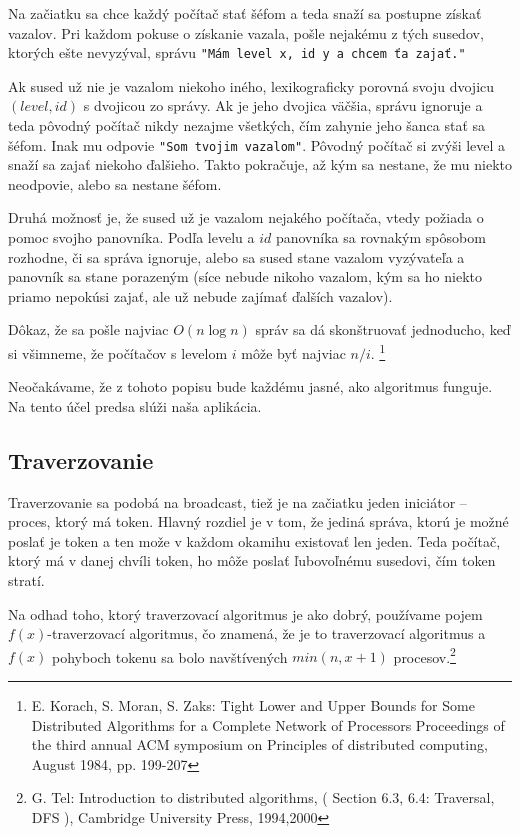 Na začiatku sa chce každý počítač stať šéfom a teda snaží sa postupne získať vazalov. Pri každom
pokuse o získanie vazala, pošle nejakému z tých susedov, ktorých ešte nevyzýval, správu \verb!"Mám level x, id y a chcem ťa zajať."! 

Ak sused už nie je vazalom niekoho iného, lexikograficky porovná svoju dvojicu $(level, id)$ s
dvojicou zo správy. 
Ak je jeho dvojica väčšia, správu ignoruje a teda pôvodný počítač nikdy nezajme všetkých, čím
zahynie jeho šanca stať sa šéfom. 
Inak mu odpovie \verb!"Som tvojim vazalom"!. Pôvodný počítač si zvýši level a snaží sa zajať niekoho
ďalšieho. Takto pokračuje, až kým sa nestane, že mu niekto neodpovie, alebo sa nestane šéfom.

Druhá možnosť je, že sused už je vazalom nejakého počítača, vtedy požiada o pomoc svojho panovníka.
Podľa levelu a $id$ panovníka sa rovnakým spôsobom rozhodne, či sa správa ignoruje, alebo 
sa sused stane vazalom vyzývateľa a panovník sa stane porazeným (síce nebude nikoho vazalom, kým sa
ho niekto priamo nepokúsi zajať, ale už nebude zajímať ďalších vazalov).

Dôkaz, že sa pošle najviac $O(n\log n)$ správ sa dá skonštruovať jednoducho, keď si všimneme, 
že počítačov s levelom $i$ môže byť najviac $n/i$.
\footnote{E. Korach, S. Moran, S. Zaks: Tight Lower and Upper Bounds for Some Distributed Algorithms
for a Complete Network of Processors Proceedings of the third annual ACM symposium on Principles of
distributed computing, August 1984, pp. 199-207}
 
Neočakávame, že z tohoto popisu bude každému jasné, ako algoritmus funguje. Na tento účel predsa
slúži naša aplikácia.

\subsection{Traverzovanie}

Traverzovanie sa podobá na broadcast, tiež je na začiatku jeden iniciátor -- proces, ktorý má token.
Hlavný rozdiel je  v tom, že jediná správa, ktorú je možné poslať je token a ten može v každom
okamihu existovať len jeden. Teda počítač, ktorý má v danej chvíli token, ho môže poslať ľubovoľnému
susedovi, čím token stratí.

Na odhad toho, ktorý traverzovací algoritmus je ako dobrý, používame pojem $f(x)$-traverzovací
algoritmus, čo znamená, že je to traverzovací algoritmus a $f(x)$ pohyboch tokenu sa bolo
navštívených $min(n, x+1)$ procesov.\footnote{G. Tel: Introduction to distributed algorithms, ( Section 6.3, 6.4: Traversal, DFS
), Cambridge University Press, 1994,2000}

